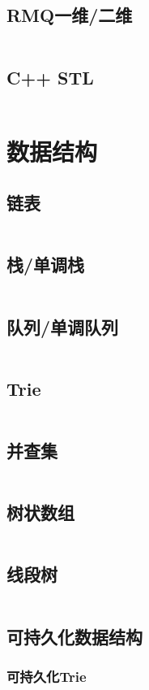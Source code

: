 \documentclass[a4paper,12pt]{article}
\begin{document}
\subsection{RMQ一维/二维}
\inputminted[breaklines]{c++}{basic/rmq.cc}
\subsection{C++ STL}
\inputminted[breaklines]{md}{basic/stl.cc}

\newpage
\section{数据结构}
\subsection{链表}
\inputminted[breaklines]{c++}{ds/list.cc}
\subsection{栈/单调栈}
\inputminted[breaklines]{c++}{ds/stack.cc}
\subsection{队列/单调队列}
\inputminted[breaklines]{c++}{ds/queue.cc}
\subsection{Trie}
\inputminted[breaklines]{c++}{ds/trie.cc}
\subsection{并查集}
\inputminted[breaklines]{c++}{ds/dsu.cc}
\subsection{树状数组}
\inputminted[breaklines]{c++}{ds/tree_array.cc}
\subsection{线段树}
\inputminted[breaklines]{c++}{ds/seg_tree.cc}
\subsection{可持久化数据结构}
\subsubsection{可持久化Trie}
\inputminted[breaklines]{c++}{ds/last_trie.cc}
\end{document}
